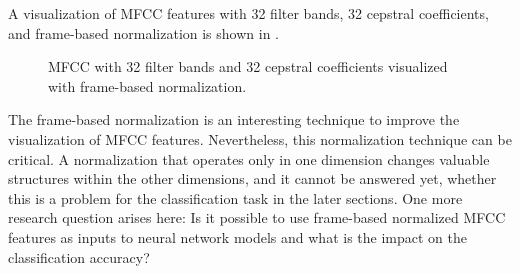 A visualization of MFCC features with 32 filter bands, 32 cepstral coefficients, and frame-based normalization is shown in .
\begin{figure}[!ht]
  \centering
  \caption{MFCC with 32 filter bands and 32 cepstral coefficients visualized with frame-based normalization.}
  \label{fig:signal_mfcc_showcase_mfcc32}
\end{figure}
\FloatBarrier
\noindent
The frame-based normalization is an interesting technique to improve the visualization of MFCC features.
Nevertheless, this normalization technique can be critical. 
A normalization that operates only in one dimension changes valuable structures within the other dimensions, and it cannot be answered yet, whether this is a problem for the classification task in the later sections.
One more research question arises here: Is it possible to use frame-based normalized MFCC features as inputs to neural network models and what is the impact on the classification accuracy?


